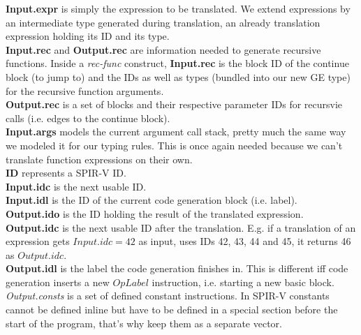 \documentclass[letterpaper,12pt]{article}
\begin{document}
\textbf{Input.expr} is simply the expression to be translated. We extend expressions
by an intermediate type generated during translation, an already translation
expression holding its ID and its type. \\
\textbf{Input.rec} and \textbf{Output.rec} are information needed to generate recursive
functions. Inside a \textit{rec-func} construct, \textbf{Input.rec} is the block 
ID of the continue block (to jump to) and the IDs as well as types (bundled into
our new GE type) for the recursive function arguments. \\
\textbf{Output.rec} is a set of blocks and their respective parameter IDs for
recursvie calls (i.e. edges to the continue block). \\
\textbf{Input.args} models the current argument call stack, pretty much the same
way we modeled it for our typing rules. This is once again needed because
we can't translate function expressions on their own. \\
\textbf{ID} represents a SPIR-V ID. \\
\textbf{Input.idc} is the next usable ID. \\
\textbf{Input.idl} is the ID of the current code generation block (i.e. label). \\
\textbf{Output.ido} is the ID holding the result of the translated expression. \\
\textbf{Output.idc} is the next usable ID after the translation.
E.g. if a translation of an expression gets $Input.idc = 42$ as input, 
uses IDs 42, 43, 44 and 45, it returns 46 as $Output.idc$. \\
\textbf{Output.idl} is the label the code generation finishes in.
This is different iff code generation inserts a new $OpLabel$ instruction,
i.e. starting a new basic block. \\


\textit{Output.consts} is a set of defined constant instructions. In SPIR-V constants
cannot be defined inline but have to be defined in a special section before
the start of the program, that's why keep them as a separate vector.
\end{document}
